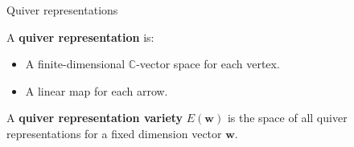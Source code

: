 \documentclass[final]{beamer}
\newlength{\onecolwid}
\newcommand{\CC}{\mathbb{C}}
\newcommand{\bw}{\mathbf{w}}
\begin{document}
\begin{frame}[t]
\begin{columns}[t]
\begin{column}{\onecolwid}
\vspace{-5mm}
\begin{block}{Quiver representations}
\begin{center}
\begin{minipage}[t]{0.5\textwidth}
\kern0pt
\raggedright
A \textbf{quiver representation} is:
\begin{itemize}
\item A finite-dimensional $\CC$-vector space for each vertex.
\item A linear map for each arrow.
\end{itemize}\end{minipage}%
\begin{minipage}[t]{0.5\textwidth}
\kern0pt
\center
\vspace{.5cm}
\end{minipage}%
\end{center}

\vspace{2cm}
A \textbf{quiver representation variety} $E(\bw)$ is the space of all quiver representations for a fixed dimension vector $\bw$.
\vspace{10mm}


\end{block}
\end{column}
\end{columns}
\end{frame}
\end{document}
